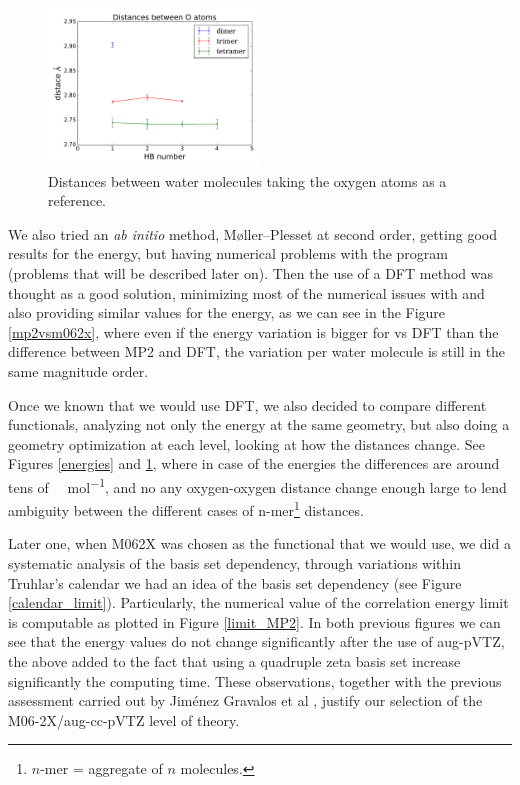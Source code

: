 \begin{figure} %
    \centering
\vspace*{-1cm}
    \includegraphics[width=0.5\textwidth]{4/plots/theory_level/distances.pdf}
    \caption{Distances between water molecules taking the oxygen atoms as a reference.}
    \label{distances}
\end{figure}

We also tried an \textit{ab initio} method, Møller–Plesset at second order,
getting good results for the energy, but having numerical problems with the
{} program (problems that will be described later on). Then the use
of a DFT method was thought as a good solution, minimizing most of the
numerical issues with {} and also providing similar values for the
energy, as we can see in the Figure \ref{mp2vsm062x}, where even if the energy
variation is bigger for {} vs DFT than the difference between MP2
and DFT, the variation per water molecule is still in the same magnitude order.

\newpage

Once we known that we would use DFT, we also decided to compare different
functionals, analyzing not only the energy at the same geometry, but also doing
a geometry optimization at each level, looking at how the distances change.
See Figures \ref{energies} and \ref{distances}, where in case of the energies
the differences are around tens of \si{\kilo\calorie\per\mole}, and no any
oxygen-oxygen distance change enough large to lend ambiguity between the
different cases of \gls{n-mer}\footnote{$n$-mer = aggregate of $n$ molecules.}
distances.

Later one, when M062X was chosen as the functional that we would use, we did a
systematic analysis of the basis set dependency, through variations within
Truhlar’s calendar \cite{Papajak2011} we had an idea of the basis set
dependency (see Figure \ref{calendar_limit}). Particularly, the numerical value
of the correlation energy limit is computable as plotted in Figure
\ref{limit_MP2}. In both previous figures we can see that the energy values do
not change significantly after the use of aug-pVTZ, the above added to the fact
that using a quadruple zeta basis set increase significantly the computing
time.  These observations, together with the previous assessment carried out by
Jiménez Gravalos et al , justify our selection of
the M06-2X/aug-cc-pVTZ level of theory. 

